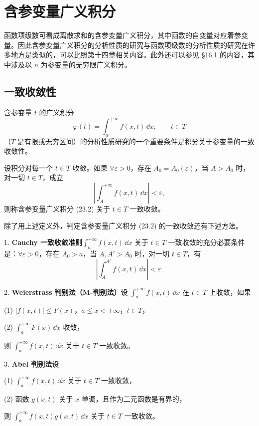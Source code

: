 \section{含参变量广义积分}

函数项级数可看成离散求和的含参变量广义积分，其中函数的自变量对应着参变量。因此含参变量广义积分的分析性质的研究与函数项级数的分析性质的研究在许多地方是类似的，可以比照第十四章相关内容。此外还可以参见 §16.1 的内容，其中涉及以 $n$ 为参变量的无穷限广义积分。

\subsection{一致收敛性}

含参变量 $t$ 的广义积分
\begin{equation}
  \varphi(t)=\int_a^{+\infty}f(x,t)\,\dd x,\qquad t\in T
  \tag{23.2}
  \label{eq:23.2}
\end{equation}
（$T$ 是有限或无穷区间）的分析性质研究的一个重要条件是积分关于参变量的一致收敛性。

设积分对每一个 $t\in T$ 收敛。如果 $\forall\varepsilon>0$，存在 $A_0=A_0(\varepsilon)$，当 $A>A_0$ 时，对一切 $t\in T$，成立
\[
  \left|\int_A^{+\infty}f(x,t)\,\dd x\right|<\varepsilon,
\]
则称含参变量广义积分 (23.2) 关于 $t\in T$ 一致收敛。

除了用上述定义外，判定含参变量广义积分 (23.2) 的一致收敛还有下述方法。

1. \textbf{Cauchy 一致收敛准则}\quad $\displaystyle\int_a^{+\infty}f(x,t)\,\dd x$ 关于 $t\in T$ 一致收敛的充分必要条件是：$\forall\varepsilon>0$，存在 $A_0>a$，当 $A,A'>A_0$ 时，对一切 $t\in T$，有
\[
  \left|\int_A^{A'}f(x,t)\,\dd x\right|<\varepsilon.
\]

2. \textbf{Weierstrass 判别法（M-判别法）}\quad 设 $\displaystyle\int_a^{+\infty}f(x,t)\,\dd x$ 在 $t\in T$ 上收敛，如果

(1) $|f(x,t)|\leqslant F(x)$，$a\leqslant x<+\infty$，$t\in T$，

(2) $\displaystyle\int_a^{+\infty}F(x)\,\dd x$ 收敛，

则 $\displaystyle\int_a^{+\infty}f(x,t)\,\dd x$ 关于 $t\in T$ 一致收敛。

3. \textbf{Abel 判别法}\quad 设

(1) $\displaystyle\int_a^{+\infty}f(x,t)\,\dd x$ 关于 $t\in T$ 一致收敛，

(2) 函数 $g(x,t)$ 关于 $x$ 单调，且作为二元函数是有界的，

则 $\displaystyle\int_a^{+\infty}f(x,t)g(x,t)\,\dd x$ 关于 $t\in T$ 一致收敛。

